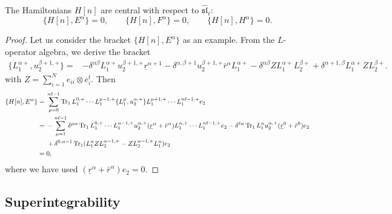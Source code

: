 \begin{prop}
    The Hamiltonians $H[n]$ are central with respect to $\widehat{\mathfrak{sl}}_\ell$:
    \begin{equation}
        \{ H[n], E^\alpha \} = 0, \qquad \{ H[n], F^\alpha \} = 0, \qquad \{ H[n], H^\alpha \} = 0.
    \end{equation}
\end{prop}

\begin{proof}
    Let us consider the bracket $\{ H[n],E^\alpha \}$ as an example. From the $L$-operator algebra, we derive the bracket
    \begin{equation*}
        \begin{aligned}
            \{ L_1^{\alpha+},u_2^{\beta+1,+} \}
            ={}& {-\delta^{\alpha\beta}} L_1^{\alpha+} u_2^{\beta+1,+} \underline r^{\alpha+1} - \delta^{\alpha,\beta+1} u_2^{\beta+1,+} \bar r^\alpha L_1^{\alpha+} - \delta^{\alpha\beta} Z L_1^{\alpha+} L_2^{\beta+} + \delta^{\alpha+1,\beta} L_1^{\alpha+} Z L_2^{\beta+}.
        \end{aligned}
    \end{equation*}
    with $Z = \sum_{i=1}^N e_{ii} \otimes e_i^t$. Then
    \begin{equation*}
        \begin{aligned}
            \{ H[n],E^\alpha \}
            ={}& \sum_{\mu=0}^{n\ell-1} \operatorname{Tr}_1 L_1^{0,+} \cdots L_1^{\mu-1,+} \{ L_1^\mu, u_2^{\alpha,+} \} L_1^{\mu+1,+} \cdots L_1^{n\ell-1,+} e_2 \\
            ={}& -\sum_{\mu=1}^{n\ell-1} \delta^{\mu\alpha} \operatorname{Tr}_1 L_1^{0,+} \cdots L_1^{\alpha-1,+} u_2^{\alpha,+} (\underline r^{\alpha} + \bar r^\alpha) L_1^{\alpha,+} \cdots L_1^{n\ell-1,+} e_2 - \delta^{\ell\alpha} \operatorname{Tr}_1 L_1^n u_2^{\alpha,+} (\underline r^{0}+\bar r^0) e_2 \\
            & + \delta^{0,\alpha-1} \operatorname{Tr}_1 (L_1^n Z L_2^{\alpha-1,+}-Z  L_2^{\alpha-1,+} L_1^n) e_2 \\
            ={}& 0,
        \end{aligned}
    \end{equation*}
    where we have used $(\underline r^\alpha + \bar r^\alpha) e_2 = 0$.
\end{proof}

\subsection{Superintegrability}

